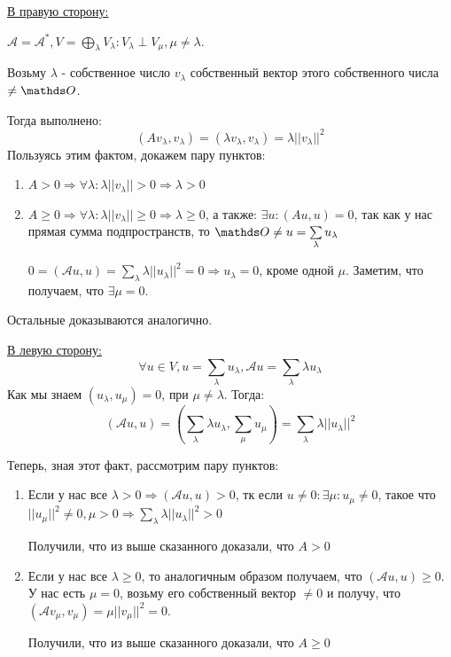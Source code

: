 \uline{В правую сторону:}

$ \mathcal{A} = \mathcal{A}^*, V = \bigoplus\limits_{\lambda} V_\lambda: V_\lambda \perp V_\mu, \mu \neq \lambda$.

Возьму $\lambda$ - собственное число $v_\lambda$ собственный вектор этого собственного числа $\neq \zero$.

Тогда выполнено: $$(Av_\lambda, v_\lambda) = (\lambda v_\lambda, v_\lambda) = \lambda ||v_\lambda||^2$$
Пользуясь этим фактом, докажем пару пунктов:

\begin{enumerate}
    \item $A >0 \Rightarrow \forall \lambda : \lambda ||v_\lambda|| >0 \Rightarrow \lambda >0$
    \item $A \geq  0 \Rightarrow \forall \lambda: \lambda ||v_\lambda|| \geq 0 \Rightarrow \lambda \geq 0$, а также:
    $\exists u: (Au,u) = 0$, так как у нас прямая сумма подпространств, то $\zero \neq u = \sum\limits_\lambda u_\lambda$

    $0=(\mathcal{A}u,u) = \sum\limits_\lambda \lambda||u_\lambda||^2 =0 \Rightarrow u_\lambda =0$, кроме одной $\mu$. Заметим, что получаем, что $\exists \mu = 0$. 
\end{enumerate}
Остальные доказываются аналогично.

\uline{В левую сторону:}
$$\forall u \in V, u =\sum\limits_{\lambda}  u_\lambda, \mathcal{A}u = \sum\limits_{\lambda} \lambda u_\lambda$$
Как мы знаем $(u_\lambda, u_\mu ) = 0$, при $ \mu \neq \lambda$. Тогда: $$(\mathcal{A}u,u) = (\sum\limits_{\lambda}\lambda u_\lambda, \sum\limits_\mu u_\mu)  = \sum\limits_{\lambda}\lambda ||u_\lambda||^2 $$

Теперь, зная этот факт, рассмотрим пару пунктов:

\begin{enumerate}
    \item Если у нас все $\lambda > 0 \Rightarrow (\mathcal{A}u,u) > 0$, тк если $u \neq 0 : \exists \mu: u_\mu \neq 0$, такое что $||u_\mu||^2 \neq 0, \mu >0 \Rightarrow \sum\limits_{\lambda}\lambda||u_\lambda||^2 > 0$
    
    Получили, что из выше сказанного доказали, что $A > 0$

    \item Если у нас все $\lambda \geq 0$, то аналогичным образом получаем, что $ (\mathcal{A}u,u) \geq 0$. У нас есть $\mu = 0$, возьму его собственный вектор $\neq 0$ и получу, что $(\mathcal{A} v_\mu,v_\mu) = \mu ||v_\mu||^2 = 0$.

     Получили, что из выше сказанного доказали, что $A \geq 0$
\end{enumerate}

